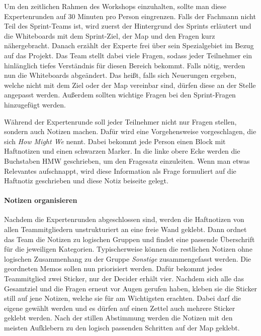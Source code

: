 Um den zeitlichen Rahmen des Workshops einzuhalten, sollte man diese Expertenrunden auf 30 Minuten pro Person eingrenzen. Falls der Fachmann nicht Teil des Sprint-Teams ist, wird zuerst der Hintergrund des Sprints erläutert und die Whiteboards mit dem Sprint-Ziel, der Map und den Fragen kurz nähergebracht. Danach erzählt der Experte frei über sein Spezialgebiet im Bezug auf das Projekt. Das Team stellt dabei viele Fragen, sodass jeder Teilnehmer ein hinlänglich tiefes Verständnis für diesen Bereich bekommt. Falls nötig, werden nun die Whiteboards abgeändert. Das heißt, falls sich Neuerungen ergeben, welche nicht mit dem Ziel oder der Map vereinbar sind, dürfen diese an der Stelle angepasst werden. Außerdem sollten wichtige Fragen bei den Sprint-Fragen hinzugefügt werden.

Während der Expertenrunde soll jeder Teilnehmer nicht nur Fragen stellen, sondern auch Notizen machen. Dafür wird eine Vorgehensweise vorgeschlagen, die sich \textit{How Might We} nennt. Dabei bekommt jede Person einen Block mit Haftnotizen und einen schwarzen Marker. In die linke obere Ecke werden die Buchstaben HMW geschrieben, um den Fragesatz einzuleiten. Wenn man etwas Relevantes aufschnappt, wird diese Information als Frage formuliert auf die Haftnotiz geschrieben und diese Notiz beiseite gelegt.

\paragraph{Notizen organisieren}
Nachdem die Expertenrunden abgeschlossen sind, werden die Haftnotizen von allen Teammitgliedern unstrukturiert an eine freie Wand geklebt. Dann ordnet das Team die Notizen zu logischen Gruppen und findet eine passende Überschrift für die jeweiligen Kategorien. Typischerweise können die restlichen Notizen ohne logischen Zusammenhang zu der Gruppe \textit{Sonstige} zusammengefasst werden.
Die geordneten Memos sollen nun priorisiert werden. Dafür bekommt jedes Teammitglied zwei Sticker, nur der Decider erhält vier. Nachdem sich alle das Gesamtziel und die Fragen erneut vor Augen gerufen haben, kleben sie die Sticker still auf jene Notizen, welche sie für am Wichtigsten erachten. Dabei darf die eigene gewählt werden und es dürfen auf einen Zettel auch mehrere Sticker geklebt werden. Nach der stillen Abstimmung werden die Notizen mit den meisten Aufklebern zu den logisch passenden Schritten auf der Map geklebt.

